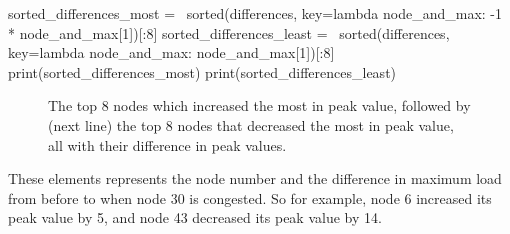 \documentclass[paper=a4, fontsize=12pt]{scrartcl} %
\numberwithin{equation}{section}       %
\numberwithin{figure}{section}         %
\numberwithin{table}{section}          %
\begin{document}
\begin{enumerate}
\begin{python}
    sorted_differences_most = \
        sorted(differences, 
               key=lambda node_and_max: -1 * node_and_max[1])[:8]
    sorted_differences_least = \
        sorted(differences, 
               key=lambda node_and_max: node_and_max[1])[:8]
    print(sorted_differences_most)
    print(sorted_differences_least)
\end{python}

\begin{figure}[h]
\caption{The top 8 nodes which increased the most in peak value, followed by (next line) the top 8 nodes that decreased the most in peak value, all with their difference in peak values.}
\centering

\end{figure}

These elements represents the node number and the difference in maximum load from before to when node 30 is congested. So for example, node 6 increased its peak value by 5, and node 43 decreased its peak value by 14.



\end{enumerate}
\end{document}
